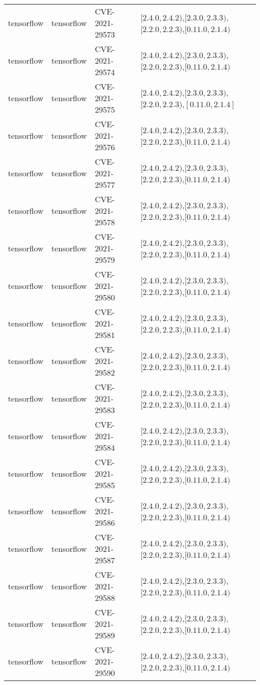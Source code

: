 \begin{tabular}{llll}
tensorflow & tensorflow & CVE-2021-29573 & $[2.4.0,2.4.2)$,$[2.3.0,2.3.3)$,$[2.2.0,2.2.3)$,$[0.11.0,2.1.4)$ \\
tensorflow & tensorflow & CVE-2021-29574 & $[2.4.0,2.4.2)$,$[2.3.0,2.3.3)$,$[2.2.0,2.2.3)$,$[0.11.0,2.1.4)$ \\
tensorflow & tensorflow & CVE-2021-29575 & $[2.4.0,2.4.2)$,$[2.3.0,2.3.3)$,$[2.2.0,2.2.3)$,$[0.11.0,2.1.4]$ \\
tensorflow & tensorflow & CVE-2021-29576 & $[2.4.0,2.4.2)$,$[2.3.0,2.3.3)$,$[2.2.0,2.2.3)$,$[0.11.0,2.1.4)$ \\
tensorflow & tensorflow & CVE-2021-29577 & $[2.4.0,2.4.2)$,$[2.3.0,2.3.3)$,$[2.2.0,2.2.3)$,$[0.11.0,2.1.4)$ \\
tensorflow & tensorflow & CVE-2021-29578 & $[2.4.0,2.4.2)$,$[2.3.0,2.3.3)$,$[2.2.0,2.2.3)$,$[0.11.0,2.1.4)$ \\
tensorflow & tensorflow & CVE-2021-29579 & $[2.4.0,2.4.2)$,$[2.3.0,2.3.3)$,$[2.2.0,2.2.3)$,$[0.11.0,2.1.4)$ \\
tensorflow & tensorflow & CVE-2021-29580 & $[2.4.0,2.4.2)$,$[2.3.0,2.3.3)$,$[2.2.0,2.2.3)$,$[0.11.0,2.1.4)$ \\
tensorflow & tensorflow & CVE-2021-29581 & $[2.4.0,2.4.2)$,$[2.3.0,2.3.3)$,$[2.2.0,2.2.3)$,$[0.11.0,2.1.4)$ \\
tensorflow & tensorflow & CVE-2021-29582 & $[2.4.0,2.4.2)$,$[2.3.0,2.3.3)$,$[2.2.0,2.2.3)$,$[0.11.0,2.1.4)$ \\
tensorflow & tensorflow & CVE-2021-29583 & $[2.4.0,2.4.2)$,$[2.3.0,2.3.3)$,$[2.2.0,2.2.3)$,$[0.11.0,2.1.4)$ \\
tensorflow & tensorflow & CVE-2021-29584 & $[2.4.0,2.4.2)$,$[2.3.0,2.3.3)$,$[2.2.0,2.2.3)$,$[0.11.0,2.1.4)$ \\
tensorflow & tensorflow & CVE-2021-29585 & $[2.4.0,2.4.2)$,$[2.3.0,2.3.3)$,$[2.2.0,2.2.3)$,$[0.11.0,2.1.4)$ \\
tensorflow & tensorflow & CVE-2021-29586 & $[2.4.0,2.4.2)$,$[2.3.0,2.3.3)$,$[2.2.0,2.2.3)$,$[0.11.0,2.1.4)$ \\
tensorflow & tensorflow & CVE-2021-29587 & $[2.4.0,2.4.2)$,$[2.3.0,2.3.3)$,$[2.2.0,2.2.3)$,$[0.11.0,2.1.4)$ \\
tensorflow & tensorflow & CVE-2021-29588 & $[2.4.0,2.4.2)$,$[2.3.0,2.3.3)$,$[2.2.0,2.2.3)$,$[0.11.0,2.1.4)$ \\
tensorflow & tensorflow & CVE-2021-29589 & $[2.4.0,2.4.2)$,$[2.3.0,2.3.3)$,$[2.2.0,2.2.3)$,$[0.11.0,2.1.4)$ \\
tensorflow & tensorflow & CVE-2021-29590 & $[2.4.0,2.4.2)$,$[2.3.0,2.3.3)$,$[2.2.0,2.2.3)$,$[0.11.0,2.1.4)$ \\

\end{tabular}
